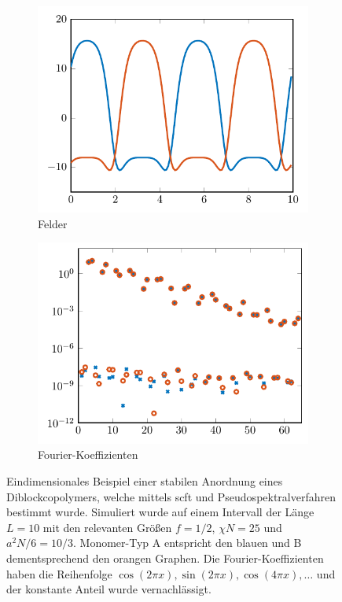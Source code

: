 \documentclass[../main.tex]{subfiles}
\begin{document}
\begin{figure}[tb]
    \centering
    \begin{subfigure}[b]{0.495\textwidth}
        \centering
        \includegraphics[width=1\textwidth]{figures/einleitung/scft1.pdf}
        \caption{Felder}
    \end{subfigure}
    \begin{subfigure}[b]{0.495\textwidth}
        \centering
        \includegraphics[width=1\textwidth]{figures/einleitung/scft2.pdf}
        \caption{Fourier-Koeffizienten}
    \end{subfigure}
    \caption[%
    Eindimensionales Beispiel einer stabilen Anordnung eines Diblockcopolymers.
    ]{%
        Eindimensionales Beispiel einer stabilen Anordnung eines Diblockcopolymers, welche mittels \ac{scft} und Pseudospektralverfahren bestimmt wurde.
        Simuliert wurde auf einem Intervall der Länge $L = 10$ mit den relevanten Größen $f = 1/2$, $\chi N = 25$ und $a^{2} N / 6 = 10 / 3$.
        Monomer-Typ A entspricht den blauen und B dementsprechend den orangen Graphen.
        Die Fourier-Koeffizienten haben die Reihenfolge $\cos(2 \pi x), \sin(2 \pi x), \cos(4 \pi x), \dots$ und der konstante Anteil wurde vernachlässigt.
    }
    \label{figure:felder_nach_iterationsverfahren}
\end{figure}
\end{document}
